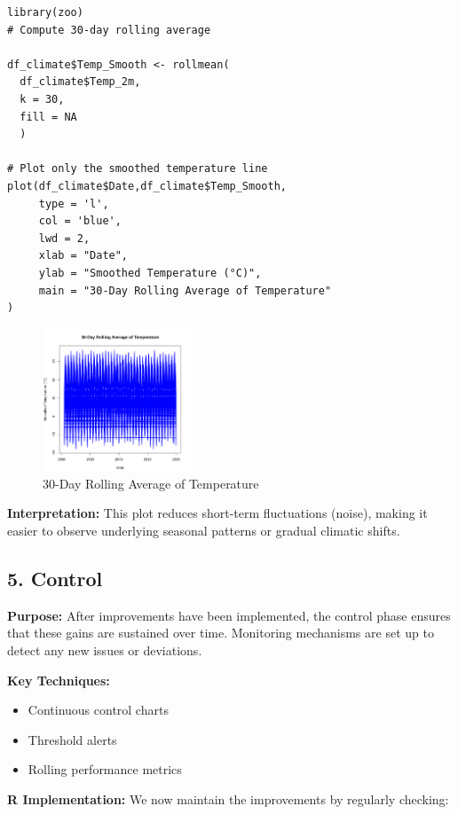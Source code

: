 \begin{verbatim}
library(zoo)
# Compute 30-day rolling average

df_climate$Temp_Smooth <- rollmean(
  df_climate$Temp_2m, 
  k = 30, 
  fill = NA
  )

# Plot only the smoothed temperature line
plot(df_climate$Date,df_climate$Temp_Smooth,
     type = 'l',
     col = 'blue', 
     lwd = 2,
     xlab = "Date", 
     ylab = "Smoothed Temperature (°C)",
     main = "30-Day Rolling Average of Temperature"
) 
\end{verbatim}
\clearpage
\begin{figure}[h]
\centering
\includegraphics[width=0.4\textwidth]{figures/rolling_avg.png}
\caption{30-Day Rolling Average of Temperature}
\end{figure}

\textbf{Interpretation:} This plot reduces short-term fluctuations (noise), making it easier to observe underlying seasonal patterns or gradual climatic shifts.

\subsection*{5. Control}

\textbf{Purpose:} After improvements have been implemented, the control phase ensures that these gains are sustained over time. Monitoring mechanisms are set up to detect any new issues or deviations.

\textbf{Key Techniques:}
\begin{itemize}
  \item Continuous control charts
  \item Threshold alerts
  \item Rolling performance metrics
\end{itemize}

\textbf{R Implementation:} We now maintain the improvements by regularly checking:\\

